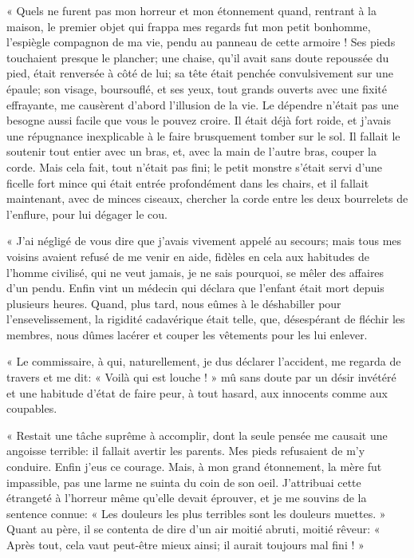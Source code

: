 « Quels ne furent pas mon horreur et mon étonnement quand, rentrant à la
maison, le premier objet qui frappa mes regards fut mon petit bonhomme,
l’espiègle compagnon de ma vie, pendu au panneau de
cette armoire ! Ses pieds touchaient presque le plancher; une chaise,
qu’il avait sans doute repoussée du pied, était
renversée à côté de lui; sa tête était penchée convulsivement sur une
épaule; son visage, boursouflé, et ses yeux, tout grands ouverts avec
une fixité effrayante, me causèrent d’abord
l’illusion de la vie. Le dépendre
n’était pas une besogne aussi facile que vous le
pouvez croire. Il était déjà fort roide, et j’avais
une répugnance inexplicable à le faire brusquement tomber sur le sol.
Il fallait le soutenir tout entier avec un bras, et, avec la main de
l’autre bras, couper la corde. Mais cela fait, tout
n’était pas fini; le petit monstre
s’était servi d’une ficelle fort
mince qui était entrée profondément dans les chairs, et il fallait
maintenant, avec de minces ciseaux, chercher la corde entre les deux
bourrelets de l’enflure, pour lui dégager le cou.

« J’ai négligé de vous dire que
j’avais vivement appelé au secours; mais tous mes
voisins avaient refusé de me venir en aide, fidèles en cela aux
habitudes de l’homme civilisé, qui ne veut jamais, je
ne sais pourquoi, se mêler des affaires d’un pendu.
Enfin vint un médecin qui déclara que l’enfant était
mort depuis plusieurs heures. Quand, plus tard, nous eûmes à le
déshabiller pour l’ensevelissement, la rigidité
cadavérique était telle, que, désespérant de fléchir les membres, nous
dûmes lacérer et couper les vêtements pour les lui enlever.

« Le commissaire, à qui, naturellement, je dus déclarer
l’accident, me regarda de travers et me dit: « Voilà
qui est louche ! » mû sans doute par un désir invétéré et une habitude
d’état de faire peur, à tout hasard, aux innocents
comme aux coupables.

« Restait une tâche suprême à accomplir, dont la seule pensée me causait
une angoisse terrible: il fallait avertir les parents. Mes pieds
refusaient de m’y conduire. Enfin
j’eus ce courage. Mais, à mon grand étonnement, la
mère fut impassible, pas une larme ne suinta du coin de son oeil.
J’attribuai cette étrangeté à
l’horreur même qu’elle devait
éprouver, et je me souvins de la sentence connue: « Les douleurs les
plus terribles sont les douleurs muettes. » Quant au père, il se
contenta de dire d’un air moitié abruti, moitié
rêveur: « Après tout, cela vaut peut{}-être mieux ainsi; il aurait
toujours mal fini ! »

